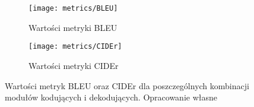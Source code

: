 \begin{figure}[H]
  \centering
  \begin{subfigure}{.5\textwidth}
    \centering
    \texttt{[image: metrics/BLEU]}
    \caption{Wartości metryki BLEU}
    \label{fig:bleu}
  \end{subfigure}%
  \centering
  \begin{subfigure}{.5\textwidth}
    \centering
    \texttt{[image: metrics/CIDEr]}
    \caption{Wartości metryki CIDEr}
    \label{fig:cider}
  \end{subfigure}%
  \caption{Wartości metryk BLEU oraz CIDEr dla poszczególnych kombinacji modułów kodujących i dekodujących. Opracowanie własne}
  \label{fig:metrics}
\end{figure}

